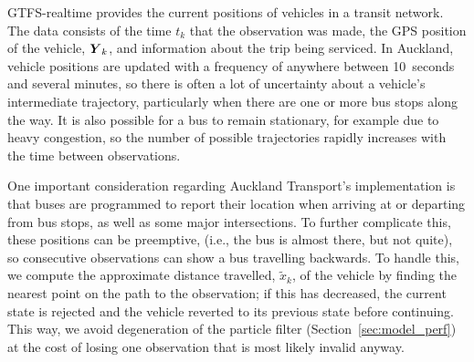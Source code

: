 GTFS-realtime provides the current positions of vehicles in a transit network.
The data consists of the time $t_k$ that the observation was made,
the GPS position of the vehicle, $\mbox{$\boldsymbol{Y}$}_k$, 
and information about the trip being serviced.
In Auckland, vehicle positions are updated with a frequency of anywhere between 10~seconds and several minutes,
so there is often a lot of uncertainty about a vehicle's intermediate trajectory,
particularly when there are one or more bus stops along the way.
It is also possible for a bus to remain stationary,
for example due to heavy congestion,
so the number of possible trajectories rapidly increases with 
the time between observations.


One important consideration regarding Auckland Transport's \rt implementation is that
buses are programmed to report their location when arriving at or departing from
bus stops, as well as some major intersections.
To further complicate this,
these positions can be preemptive,
(i.e., the bus is almost there, but not quite),
so consecutive observations can show a bus travelling backwards.
To handle this, we compute the approximate distance travelled, $\tilde x_k$,
of the vehicle by finding the nearest point on the path to the observation;
if this has decreased, the current state is rejected and the vehicle reverted
to its previous state before continuing.
This way, we avoid degeneration of the particle filter (Section~\ref{sec:model_perf})
at the cost of losing one observation that is most likely invalid anyway.

